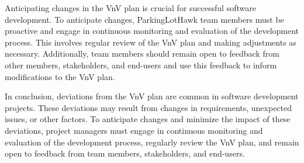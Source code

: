\documentclass[12pt, titlepage]{article}
\begin{document}
\begin{enumerate}
Anticipating changes in the VnV plan is crucial for successful software development. To anticipate changes, ParkingLotHawk team members must be proactive and engage in continuous monitoring and evaluation of the development process. This involves regular review of the VnV plan and making adjustments as necessary. Additionally, team members should remain open to feedback from other members, stakeholders, and end-users and use this feedback to inform modifications to the VnV plan.

In conclusion, deviations from the VnV plan are common in software development projects. These deviations may result from changes in requirements, unexpected issues, or other factors. To anticipate changes and minimize the impact of these deviations, project managers must engage in continuous monitoring and evaluation of the development process, regularly review the VnV plan, and remain open to feedback from team members, stakeholders, and end-users.
\end{enumerate}
\end{document}
